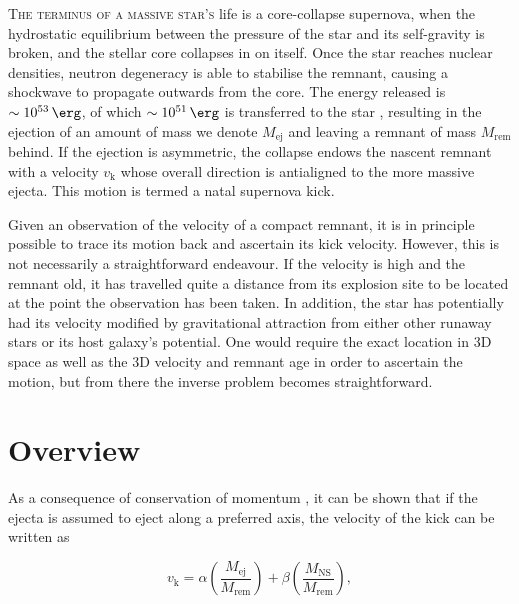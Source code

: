 \label{chap:natal_kicks}

\lettrine[lines=3]{T}{he terminus of a massive star's} life is a core-collapse supernova, when the hydrostatic equilibrium between the pressure of the star and its self-gravity is broken, and the stellar core collapses in on itself. Once the star reaches nuclear densities, neutron degeneracy is able to stabilise the remnant, causing a shockwave to propagate outwards from the core. The energy released is $\sim\SI[print-unity-mantissa=false]{1e53}{\erg}$, of which $\sim\SI[print-unity-mantissa=false]{1e51}{\erg}$ is transferred to the star \citep{Eldridge:2018}, resulting in the ejection of an amount of mass we denote $M_\text{ej}$ and leaving a remnant of mass $M_\text{rem}$ behind. If the ejection is asymmetric, the collapse endows the nascent remnant with a velocity $v_\text{k}$ whose overall direction is antialigned to the more massive ejecta. This motion is termed a natal supernova kick.

Given an observation of the velocity of a compact remnant, it is in principle possible to trace its motion back and ascertain its kick velocity. However, this is not necessarily a straightforward endeavour. If the velocity is high and the remnant old, it has travelled quite a distance from its explosion site to be located at the point the observation has been taken. In addition, the star has potentially had its velocity modified by gravitational attraction from either other runaway stars or its host galaxy's potential. One would require the exact location in 3D space as well as the 3D velocity and remnant age in order to ascertain the motion, but from there the inverse problem becomes straightforward.

\section{Overview}

As a consequence of conservation of momentum \citep{Janka:2017}, it can be shown that if the ejecta is assumed to eject along a preferred axis, the velocity of the kick can be written as

\begin{equation}
    v_\text{k} = \alpha\left(\frac{M_\text{ej}}{M_\text{rem}}\right)+\beta\left(\frac{M_\text{NS}}{M_\text{rem}}\right),\label{eq:bray_kick_pure}
\end{equation}

